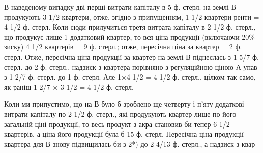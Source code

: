 В наведеному випадку дві перші витрати капіталу в 5 ф. стерл. на землі В
продукують 3 1/2 квартери, отже, згідно з припущенням, 1  1/2 квартери ренти =
4  1/2 ф. стерл. Коли сюди прилучиться третя витрата капіталу в 2 1/2 ф. стерл.,
що продукує лише 1 додатковий квартер, то вся ціна продукції (включаючи 20\%
зиску) 4  1/2 квартерів = 9 ф. стерл.; отже, пересічна ціна за квартер = 2 ф. стерл.
Отже, пересічна ціна продукції за квартер на землі В піднеслась з 1 5/7 ф. стерл.
до 2 ф. стерл., надзиск з квартера порівняно з регуляційною ціною А упав
з 1  2/7 ф. стерл. до 1 ф. стерл. Але 1×4  1/2 = 4  1/2 ф. стерл., цілком так само,
як раніш 1  2/7 × 3 1/2 = 4 1/2 ф. стерл.

Коли ми припустимо, що на В було б зроблено ще четверту і п’яту додаткові
витрати капіталу по 2  1/2 ф. стерл., які продукують квартер лише по його
загальній ціні продукції, то весь продукт з акра становив би тепер 6  1/2 квартерів,
а ціна його продукції була б 15 ф. стерл. Пересічна ціна продукції
квартера для В знову підвищилась би з 2*) до 2  4/13 ф. стерл., а надзиск з квар-
